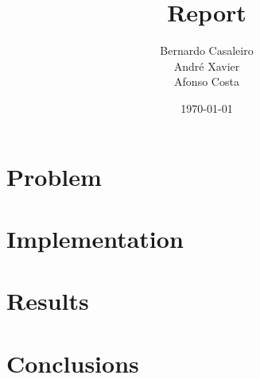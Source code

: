 \documentclass[12pt,a4paper]{article}
\title{Report}
\date{\today}
\author{Bernardo Casaleiro \\ André Xavier \\ Afonso Costa}
\begin{document}
\maketitle

\section{Problem}

\section{Implementation}

\section{Results}

\section{Conclusions}
\end{document}
